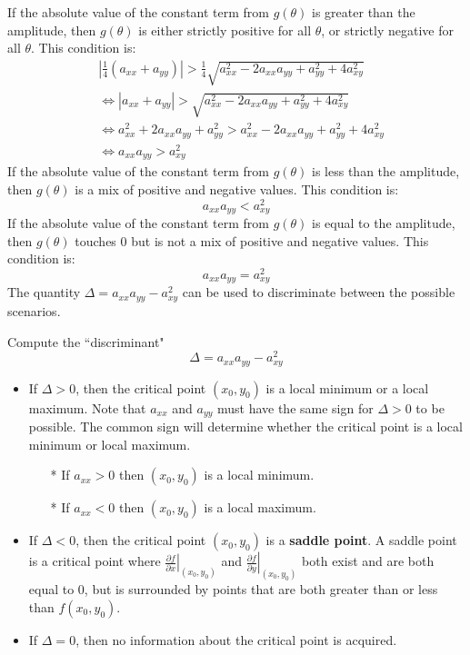 \documentclass{article}
\begin{document}
\begin{framed}
If the absolute value of the constant term from \(g(\theta)\) is greater than the amplitude, then \(g(\theta)\) is either strictly positive for all \(\theta\), or strictly negative for all \(\theta\). This condition is: 
\begin{align*}
& \left|\frac{1}{4}(a_{xx} + a_{yy})\right| > \frac{1}{4}\sqrt{a_{xx}^2 - 2a_{xx}a_{yy} + a_{yy}^2 + 4a_{xy}^2} \\ 
& \iff |a_{xx} + a_{yy}| > \sqrt{a_{xx}^2 - 2a_{xx}a_{yy} + a_{yy}^2 + 4a_{xy}^2} \\ 
& \iff a_{xx}^2 + 2a_{xx}a_{yy} + a_{yy}^2 > a_{xx}^2 - 2a_{xx}a_{yy} + a_{yy}^2 + 4a_{xy}^2 \\ 
& \iff a_{xx}a_{yy} > a_{xy}^2
\end{align*}
If the absolute value of the constant term from \(g(\theta)\) is less than the amplitude, then \(g(\theta)\) is a mix of positive and negative values. This condition is:
\[a_{xx}a_{yy} < a_{xy}^2\] 
If the absolute value of the constant term from \(g(\theta)\) is equal to the amplitude, then \(g(\theta)\) touches \(0\) but is not a mix of positive and negative values. This condition is:
\[a_{xx}a_{yy} = a_{xy}^2\] 
The quantity \(\Delta = a_{xx}a_{yy} - a_{xy}^2\) can be used to discriminate between the possible scenarios.
\end{framed}

Compute the ``discriminant" 
\[\Delta = a_{xx} a_{yy} - a_{xy}^2\]
\begin{itemize}
\item If \(\Delta > 0\), then the critical point \((x_0, y_0)\) is a local minimum or a local maximum. Note that \(a_{xx}\) and \(a_{yy}\) must have the same sign for \(\Delta > 0\) to be possible. The common sign will determine whether the critical point is a local minimum or local maximum.  
\begin{itemize}
\item[*] If \(a_{xx} > 0\) then \((x_0, y_0)\) is a local minimum. 
\item[*] If \(a_{xx} < 0\) then \((x_0, y_0)\) is a local maximum. 
\end{itemize}
\item If \(\Delta < 0\), then the critical point \((x_0, y_0)\) is a {\bf saddle point}. A saddle point is a critical point where \(\left.\frac{\partial f}{\partial x}\right|_{(x_0, y_0)}\) and \(\left.\frac{\partial f}{\partial y}\right|_{(x_0, y_0)}\) both exist and are both equal to \(0\), but is surrounded by points that are both greater than or less than \(f(x_0, y_0)\).
\item If \(\Delta = 0\), then no information about the critical point is acquired. 
\end{itemize}
\end{document}
